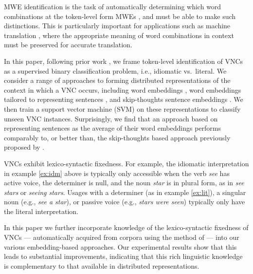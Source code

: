 \documentclass[11pt,a4paper]{article}
\begin{document}
\noindent
MWE identification is the task of automatically determining which word
combinations at the token-level form MWEs \citep{Baldwin:Kim:2009},
and must be able to make such distinctions. This is particularly
important for applications such as machine translation
\citep{Sag2002}, where the appropriate meaning of word combinations in
context must be preserved for accurate translation.


In this paper, following prior work
\citep[e.g.,][]{salton-ross-kelleher}, we frame token-level
identification of VNCs as a supervised binary classification problem,
i.e., idiomatic vs.\ literal. We consider a range of approaches to
forming distributed representations of the context in which a VNC
occurs, including word embeddings \citep{mikolov+:2013b}, word
embeddings tailored to representing sentences
\citep{kenter-borisov-derijke}, and skip-thoughts sentence embeddings
\cite{Kiros+:2015}.  We then train a support vector machine (SVM) on
these representations to classify unseen VNC instances. Surprisingly,
we find that an approach based on representing sentences as the
average of their word embeddings performs comparably to, or better
than,
the skip-thoughts based approach previously proposed by
.

VNCs exhibit lexico-syntactic fixedness. For example, the idiomatic
interpretation in example \ref{ex:idm} above is typically only
accessible when the verb \emph{see} has active voice, the determiner
is null, and the noun \emph{star} is in plural form, as in \emph{see
  stars} or \emph{seeing stars}.  Usages with a determiner (as in
example \ref{ex:lit}), a singular noun (e.g., \emph{see a star}), or
passive voice (e.g., \emph{stars were seen}) typically only have the
literal interpretation.



In this paper we further incorporate knowledge of the lexico-syntactic
fixedness of VNCs --- automatically acquired from corpora using the
method of  --- into our various embedding-based
approaches. Our experimental results show that this leads to
substantial improvements, indicating that this rich linguistic
knowledge is complementary to that available in distributed
representations.
\end{document}
